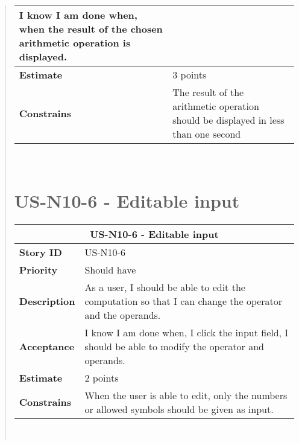 \documentclass[12pt]{report}
\begin{document}
\begin{quote}
\begin{tabular}{ |p{4cm}|p{10cm}| }
                 I know I am done when,  when the result of the chosen arithmetic operation is displayed. \\
                 \hline
                 \textbf{Estimate} &  3  points  \\
                 \hline
                 \textbf{Constrains}& The result of the arithmetic operation should be displayed in less than one second \\
                 \hline
                 
                \end{tabular}
            \hfill\break\\
            
              \section{US-N10-6 - Editable input}
                \begin{tabular}{ |p{4cm}|p{10cm}| }
                 \hline
                 \multicolumn{2}{|c|}{\textbf{US-N10-6 - Editable input} } \\
                 \hline
                 \textbf {Story ID}& US-N10-6  \\
                 \hline
                 \textbf{Priority} & Should have \\
                 \hline
                 \textbf{Description}   & As a user, I should be able to edit the computation so that I can change the operator and the operands. \\
                 \hline
                 \textbf{Acceptance}& 
                
               I know I am done when, I click the input field, I should be able to modify the operator and operands. \\
                 \hline
                 \textbf{Estimate} &  2 points  \\
                 \hline
                 \textbf{Constrains}&  When the user is able to edit, only the numbers or allowed symbols should be given as input.   \\
                 \hline
                \end{tabular}
            \hfill\break\\
            
            
             
        

\end{quote}
\end{document}
